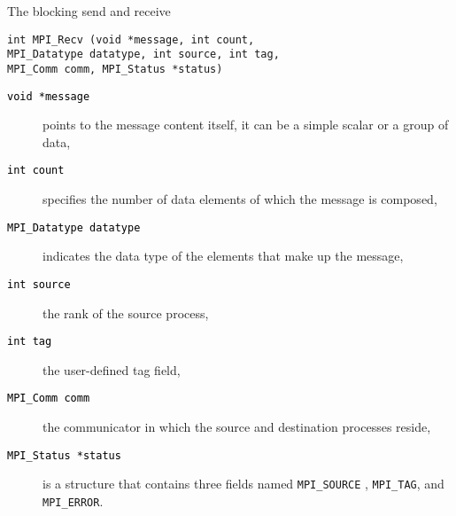 \documentclass[xcolor={svgnames,usenames}]{beamer}
\begin{document}
\begin{frame}[fragile]{The blocking send and receive}
\begin{verbatim}
int MPI_Recv (void *message, int count, 
MPI_Datatype datatype, int source, int tag,
MPI_Comm comm, MPI_Status *status)
\end{verbatim}
\begin{description}
\item[\textcolor{black}{\texttt{void *message}}] points to the message content itself, it can be a simple scalar or a group of data,
\item[\textcolor{black}{\texttt{int count}}] specifies the number of data elements of which the message is composed,
\item[\textcolor{black}{\texttt{MPI_Datatype datatype}}] indicates the \alert{data type} of the elements that make up the message,
\item[\textcolor{black}{\texttt{int source}}] the rank of the source process, 
\item[\textcolor{black}{\texttt{int tag}}] the user-defined tag field, 
\item[\textcolor{black}{\texttt{MPI_Comm comm}}] the communicator in which the source and destination processes reside,
\item[\textcolor{black}{\texttt{MPI_Status *status}}] is a structure that contains three fields named \texttt{MPI_SOURCE} , \texttt{MPI_TAG}, and \texttt{MPI_ERROR}.
\end{description}
\end{frame}
\end{document}
